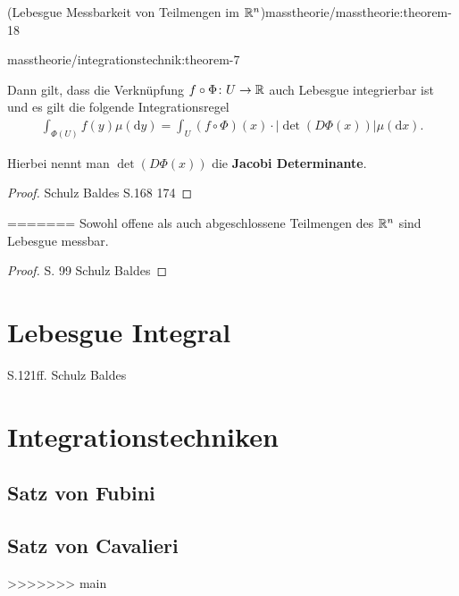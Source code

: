 \begin{theorem}{(Lebesgue Messbarkeit von Teilmengen im \protect\(\mathbb{R}^n\protect\))}{masstheorie/masstheorie:theorem-18}
\begin{theorem}{}{masstheorie/integrationstechnik:theorem-7}
\par
Dann gilt, dass die Verknüpfung \(f \circ \Phi \colon U \rightarrow \mathbb{R}\) auch Lebesgue integrierbar ist und es gilt die folgende Integrationsregel
\begin{align*}
\int_{\Phi(U)} f(y) \mu(\mathrm{d}y) = \int_U (f \circ \Phi)(x) \cdot |\det(D\Phi(x))|\mu(\mathrm{d}x).\end{align*}
\par
Hierbei nennt man \(\det(D\Phi(x))\) die \textbf{Jacobi Determinante}.
\end{theorem}

\begin{proof}
 Schulz Baldes S.168 174
\end{proof}

=======
Sowohl offene als auch abgeschlossene Teilmengen des \(\mathbb{R}^n\) sind Lebesgue messbar.
\end{theorem}

\begin{proof}
 S. 99 Schulz Baldes
\end{proof}


\section{Lebesgue Integral}
\label{\detokenize{masstheorie/lebesgue_integral:lebesgue-integral}}\label{\detokenize{masstheorie/lebesgue_integral::doc}}
\par
S.121ff. Schulz Baldes


\section{Integrationstechniken}
\label{\detokenize{masstheorie/integrationstechnik:integrationstechniken}}\label{\detokenize{masstheorie/integrationstechnik::doc}}

\subsection{Satz von Fubini}
\label{\detokenize{masstheorie/integrationstechnik:satz-von-fubini}}

\subsection{Satz von Cavalieri}
\label{\detokenize{masstheorie/integrationstechnik:satz-von-cavalieri}}
>>>>>>> main

